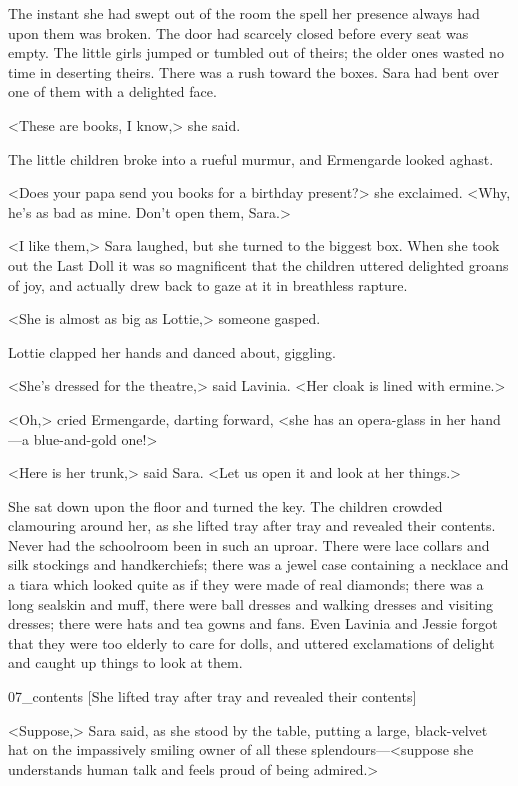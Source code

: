 The instant she had swept out of the room the spell her presence always had upon them was broken. The door had scarcely closed before every seat was empty. The little girls jumped or tumbled out of theirs; the older ones wasted no time in deserting theirs. There was a rush toward the boxes. Sara had bent over one of them with a delighted face.

<These are books, I know,> she said.

The little children broke into a rueful murmur, and Ermengarde looked aghast.

<Does your papa send you books for a birthday present?> she exclaimed. <Why, he's as bad as mine. Don't open them, Sara.>

<I like them,> Sara laughed, but she turned to the biggest box. When she took out the Last Doll it was so magnificent that the children uttered delighted groans of joy, and actually drew back to gaze at it in breathless rapture.

<She is almost as big as Lottie,> someone gasped.

Lottie clapped her hands and danced about, giggling.

<She's dressed for the theatre,> said Lavinia. <Her cloak is lined with ermine.>

<Oh,> cried Ermengarde, darting forward, <she has an opera-glass in her hand—a blue-and-gold one!>

<Here is her trunk,> said Sara. <Let us open it and look at her things.>

She sat down upon the floor and turned the key. The children crowded clamouring around her, as she lifted tray after tray and revealed their contents. Never had the schoolroom been in such an uproar. There were lace collars and silk stockings and handkerchiefs; there was a jewel case containing a necklace and a tiara which looked quite as if they were made of real diamonds; there was a long sealskin and muff, there were ball dresses and walking dresses and visiting dresses; there were hats and tea gowns and fans. Even Lavinia and Jessie forgot that they were too elderly to care for dolls, and uttered exclamations of delight and caught up things to look at them.

\begin{colorbigpic}
	[\basicscale]
	{07_contents}
	[She lifted tray after tray and revealed their contents]
\end{colorbigpic}

<Suppose,> Sara said, as she stood by the table, putting a large, black-velvet hat on the impassively smiling owner of all these splendours—<suppose she understands human talk and feels proud of being admired.>

